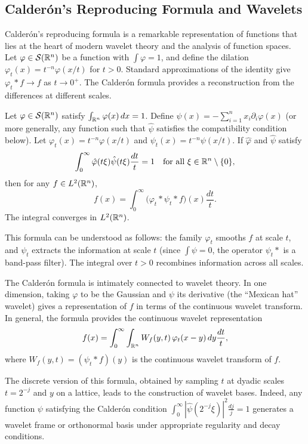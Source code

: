 \subsection{Calder\'{o}n's Reproducing Formula and Wavelets}

Calder\'{o}n's reproducing formula is a remarkable representation of functions that lies at the heart of modern wavelet theory and the analysis of function spaces. Let $\varphi \in \mathcal{S}(\mathbb{R}^n)$ be a function with $\int \varphi = 1$, and define the dilation $\varphi_t(x) = t^{-n} \varphi(x/t)$ for $t > 0$. Standard approximations of the identity give $\varphi_t * f \to f$ as $t \to 0^+$. The Calder\'{o}n formula provides a reconstruction from the differences at different scales.

\begin{theorem}
Let $\varphi \in \mathcal{S}(\mathbb{R}^n)$ satisfy $\int_{\mathbb{R}^n} \varphi(x)\,dx = 1$. Define $\psi(x) = - \sum_{i=1}^n x_i \partial_i \varphi(x)$ (or more generally, any function such that $\hat\psi$ satisfies the compatibility condition below). Let $\varphi_t(x) = t^{-n} \varphi(x/t)$ and $\psi_t(x) = t^{-n} \psi(x/t)$. If $\hat\varphi$ and $\hat\psi$ satisfy
\[
\int_0^\infty \hat\varphi(t\xi) \hat\psi(t\xi) \frac{dt}{t} = 1 \quad \text{for all } \xi \in \mathbb{R}^n \setminus \{0\},
\]
then for any $f \in L^2(\mathbb{R}^n)$,
\[
f(x) = \int_0^\infty \bigl(\varphi_t * \psi_t * f\bigr)(x) \frac{dt}{t}.
\]
The integral converges in $L^2(\mathbb{R}^n)$.
\end{theorem}

This formula can be understood as follows: the family $\varphi_t$ smooths $f$ at scale $t$, and $\psi_t$ extracts the information at scale $t$ (since $\int \psi = 0$, the operator $\psi_t*$ is a band-pass filter). The integral over $t > 0$ recombines information across all scales.

The Calder\'{o}n formula is intimately connected to wavelet theory. In one dimension, taking $\varphi$ to be the Gaussian and $\psi$ its derivative (the ``Mexican hat'' wavelet) gives a representation of $f$ in terms of the continuous wavelet transform. In general, the formula provides the continuous wavelet representation
\[
f(x) = \int_0^\infty \int_{\mathbb{R}^n} W_f(y,t) \, \varphi_t(x-y) \, dy \frac{dt}{t},
\]
where $W_f(y,t) = (\psi_t * f)(y)$ is the continuous wavelet transform of $f$.

The discrete version of this formula, obtained by sampling $t$ at dyadic scales $t = 2^{-j}$ and $y$ on a lattice, leads to the construction of wavelet bases. Indeed, any function $\psi$ satisfying the Calder\'{o}n condition $\int_0^\infty |\hat\psi(2^{-j}\xi)|^2 \frac{dj}{j} = 1$ generates a wavelet frame or orthonormal basis under appropriate regularity and decay conditions.

